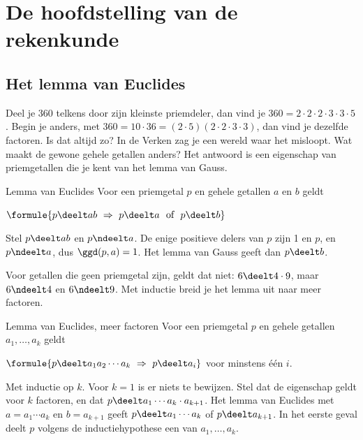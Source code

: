 \begin{oefeningen}
\end{oefeningen}

\section{De hoofdstelling van de rekenkunde}

\subsection{Het lemma van Euclides}

Deel je 360 telkens door zijn kleinste priemdeler, dan vind je $360 = 2 \cdot 2 \cdot 2 \cdot 3 \cdot 3 \cdot 5$. Begin je anders, met $360 = 10 \cdot 36 = (2 \cdot 5)(2 \cdot 2 \cdot 3 \cdot 3)$, dan vind je dezelfde factoren. Is dat altijd zo? In de Verken zag je een wereld waar het misloopt. Wat maakt de gewone gehele getallen anders? Het antwoord is een eigenschap van priemgetallen die je kent van het lemma van Gauss.

\begin{theorie}
\begin{stelling}{Lemma van Euclides}
Voor een priemgetal $p$ en gehele getallen $a$ en $b$ geldt

\vspace{1mm}
\qquad $\formule{p \deelt ab \ \Rightarrow \ p \deelt a \ \text{ of } \ p \deelt b}$
\end{stelling}

\begin{bewijs}
Stel $p \deelt ab$ en $p \ndeelt a$. De enige positieve delers van $p$ zijn 1 en $p$, en $p \ndeelt a$, dus $\ggd(p, a) = 1$. Het lemma van Gauss geeft dan $p \deelt b$.
\end{bewijs}
\end{theorie}

Voor getallen die geen priemgetal zijn, geldt dat niet: $6 \deelt 4 \cdot 9$, maar $6 \ndeelt 4$ en $6 \ndeelt 9$. Met inductie breid je het lemma uit naar meer factoren.

\begin{theorie}
\begin{stelling}{Lemma van Euclides, meer factoren}
Voor een priemgetal $p$ en gehele getallen $a_1, \ldots, a_k$ geldt

\vspace{1mm}
\qquad $\formule{p \deelt a_1 a_2 \cdots a_k \ \Rightarrow \ p \deelt a_i}$ \quad voor minstens één $i$.
\end{stelling}

\begin{bewijs}
Met inductie op $k$. Voor $k = 1$ is er niets te bewijzen. Stel dat de eigenschap geldt voor $k$ factoren, en dat $p \deelt a_1 \cdots a_k \cdot a_{k + 1}$. Het lemma van Euclides met $a = a_1 \cdots a_k$ en $b = a_{k + 1}$ geeft $p \deelt a_1 \cdots a_k$ of $p \deelt a_{k + 1}$. In het eerste geval deelt $p$ volgens de inductiehypothese een van $a_1, \ldots, a_k$.
\end{bewijs}
\end{theorie}

